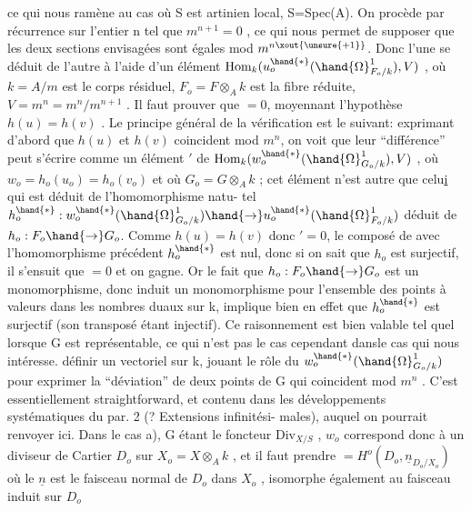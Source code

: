 
ce qui nous ramène au cas où S est artinien local, S=Spec(A). On procède
par récurrence sur l'entier n tel que $m^{n+1}=0$ , ce qui nous permet de
supposer que les deux sections envisagées  sont égales mod $m^{n\xout{\unsure{+1}}}$. Donc
l'une se déduit de l'autre à l'aide d'un élément  
$\mathrm{Hom}_k(u_o^{\hand{*}}(\hand{\Omega}^1_{F_o/k}), V)$ , où $k=A/m$ est le corps résiduel, $F_o=F\otimes_A k$ est la
fibre réduite, $V=m^n = m^n/m^{n+1}$ . Il faut prouver que \hand{$\delta$}$= 0$, moyennant
l'hypothèse $h(u)=h(v)$ . Le principe général de la vérification est le
suivant: exprimant d'abord que $h(u)$ et $h(v)$ coincident mod $m^n$, on voit
que leur ``différence'' peut s'écrire comme un élément \hand{$\delta$}$'$ de
$\mathrm{Hom}_k(w_o^{\hand{*}}(\hand{\Omega}^1_{G_o/k}),V)$ , où $w_o = h_o(u_o)=h_o(v_o)$  et où $G_o = G\otimes_A k$ ;
cet élément n'est autre que celu\uline{i} qui est déduit de  l'homomorphisme natu-%
tel $h_o^{\hand{*}} : w_o^{\hand{*}}(\hand{\Omega}^1_{G_o/k}) \hand{\to} u_o^{\hand{*}}(\hand{\Omega}^1_{F_o/k})$ déduit de $h_o: F_o\hand{\to} G_o$. Comme
$h(u)=h(v)$ donc \hand{$\delta$}$' = 0$, le composé de \hand{$\delta$} avec l'homomorphisme précédent
$h_o^{\hand{*}}$ est nul, donc si on sait que $h_o$ est surjectif, il s'ensuit que \hand{$\delta$}$=0$
et on gagne. Or le fait que $h_o:F_o\hand{\to} G_o$ est un monomorphisme, donc induit
un monomorphisme pour l'ensemble des points à valeurs dans les nombres
duaux sur k, implique bien en effet que $h_o^{\hand{*}}$ est surjectif (son transposé
étant injectif). Ce raisonnement est bien valable tel quel lorsque G
est représentable, ce qui n'est pas le cas cependant dansle cas qui nous
intéresse.   définir un vectoriel   sur k, jouant le rôle
du  $w_o^{\hand{*}}(\hand{\Omega}^1_{G_o/k})$ pour exprimer la ``déviation'' de deux points de G qui
coincident mod $m^n$ . C'est essentiellement straightforward, et contenu
dans les développements systématiques du par. 2 (? Extensions infinitési-%
males), auquel on pourrait renvoyer ici. Dans le cas a), G étant le
foncteur $\mathrm{Div}_{X/S}$ , $w_o$ correspond donc à un diviseur de Cartier  $D_o$ sur
$X_o = X\otimes_A k$ , et il faut prendre \hand{$\Omega$}$= H^o(D_o, \underline{n}_{D_o/X_o})$ où le $\underline{n}$ est le
faisceau normal de $D_o$ dans $X_o$ , isomorphe également au faisceau induit
sur $D_o$

